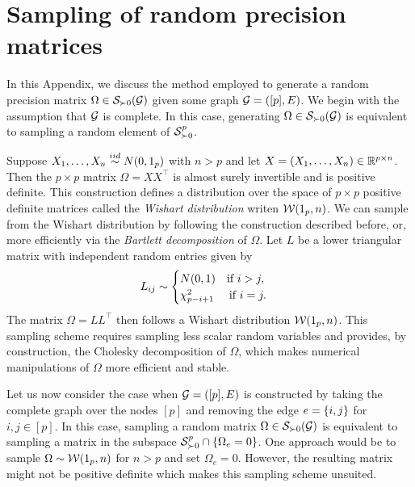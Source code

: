 \section{Sampling of random precision matrices} \label{sec-precision-sampling}

In this Appendix, we discuss the method employed to generate a random precision matrix $\Omega \in \S_{\succ 0}(\G)$ given some graph $\G = ([p], E)$. We begin with the assumption that $\G$ is complete. In this case, generating $\Omega \in \S_{\succ 0}(\G)$ is equivalent to sampling a random element of $\S^p_{\succ 0}$. 

Suppose $X_1, \ldots, X_n \simiid N(0, 1_p)$ with $n > p$ and let $X = (X_1, \ldots, X_n) \in \R^{p\times n}$. Then the $p \times p$ matrix $\Omega = XX^\top$ is almost surely invertible and is positive definite. This construction defines a distribution over the space of $p \times p$ positive definite matrices called the \textit{Wishart distribution} writen $\c{W}(1_p, n)$. We can sample from the Wishart distribution by following the construction described before, or, more efficiently via the \textit{Bartlett decomposition} \cite{10.2307/2346290} of $\Omega$. Let $L$ be a lower triangular matrix with independent random entries given by
\begin{equation*}
    L_{ij} \sim \begin{cases}
        N(0, 1) \ \ \t{ if } i > j,\\
        \chi^2_{p - i + 1} \ \ \ \t{ if } i = j.
    \end{cases}
\end{equation*}
The matrix $\Omega = L L^\top$ then follows a Wishart distribution $\c{W}(1_p, n)$. This sampling scheme requires sampling less scalar random variables and provides, by construction, the Cholesky decomposition of $\Omega$, which makes numerical manipulations of $\Omega$ more efficient and stable.

Let us now consider the case when $\G = ([p], E)$ is constructed by taking the complete graph over the nodes $[p]$ and removing the edge $e = \eset{i, j}$ for $i, j \in [p]$. In this case, sampling a random matrix $\Omega \in \S_{\succ 0}(\G)$ is equivalent to sampling a matrix in the subspace $\S^p_{\succ 0} \cap \eset{ \Omega_e = 0}$. One approach would be to sample $\Omega \sim \c{W}(1_p, n)$ for $n > p$ and set $\Omega_e = 0$. However, the resulting matrix might not be positive definite which makes this sampling scheme unsuited.

